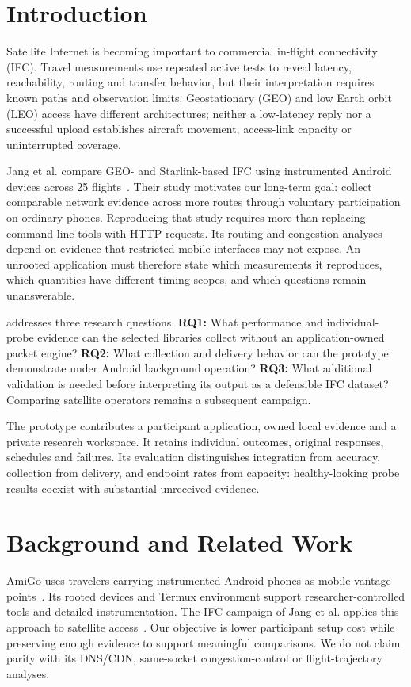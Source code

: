 \section{Introduction}
Satellite Internet is becoming important to commercial in-flight connectivity
(IFC). Travel measurements use repeated active tests to reveal latency, reachability, routing and transfer
behavior, but their interpretation requires known paths and observation limits.
Geostationary (GEO) and low Earth orbit (LEO) access have different architectures;
neither a low-latency reply nor a successful upload establishes aircraft movement,
access-link capacity or uninterrupted coverage.

Jang et al. compare GEO- and Starlink-based IFC using instrumented Android
devices across 25 flights~\cite{jang2025}. Their study motivates our long-term
goal: collect comparable network evidence across more routes through voluntary
participation on ordinary phones. Reproducing that study requires more than
replacing command-line tools with HTTP requests. Its routing and congestion
analyses depend on evidence that restricted mobile interfaces may not expose.
An unrooted application must therefore state which measurements it reproduces,
which quantities have different timing scopes, and which questions remain
unanswerable.

\system{} addresses three research questions. \textbf{RQ1:} What performance and
individual-probe evidence can the selected libraries collect without an
application-owned packet engine? \textbf{RQ2:} What collection and delivery
behavior can the prototype demonstrate under Android background operation?
\textbf{RQ3:} What additional validation is needed before interpreting its output
as a defensible IFC dataset? Comparing satellite operators remains a subsequent
campaign.

The prototype contributes a participant application, owned local evidence and a
private research workspace. It retains individual outcomes, original responses,
schedules and failures. Its evaluation distinguishes integration from accuracy,
collection from delivery, and endpoint rates from capacity: healthy-looking
probe results coexist with substantial unreceived evidence.

\section{Background and Related Work}
AmiGo uses travelers carrying instrumented Android phones as mobile vantage
points~\cite{varvello2023}. Its rooted devices and Termux environment support
researcher-controlled tools and detailed instrumentation. The IFC campaign of
Jang et al. applies this approach to satellite access~\cite{jang2025}. Our
objective is lower participant setup cost while preserving enough evidence to
support meaningful comparisons. We do not claim parity with its DNS/CDN,
same-socket congestion-control or flight-trajectory analyses.

